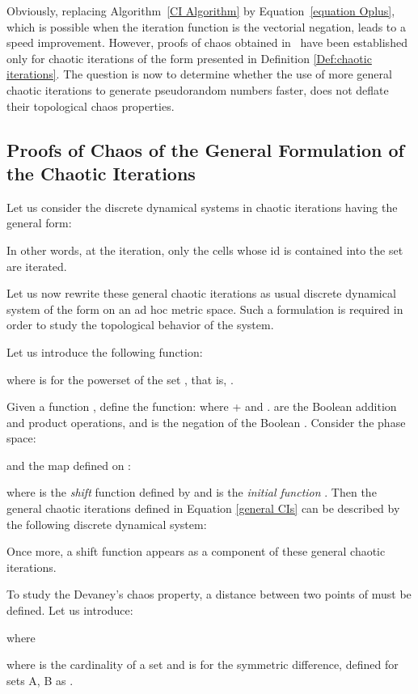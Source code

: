 \documentclass{article}
\begin{document}
Obviously, replacing Algorithm~\ref{CI Algorithm} by 
Equation~\ref{equation Oplus}, which is possible when the iteration function is
the vectorial negation, leads to a speed improvement. However, proofs
of chaos obtained in~\cite{bg10:ij} have been established
only for chaotic iterations of the form presented in Definition 
\ref{Def:chaotic iterations}. The question is now to determine whether the
use of more general chaotic iterations to generate pseudorandom numbers 
faster, does not deflate their topological chaos properties.

\subsection{Proofs of Chaos of the General Formulation of the Chaotic Iterations}
\label{deuxième def}
Let us consider the discrete dynamical systems in chaotic iterations having 
the general form:



In other words, at the  iteration, only the cells whose id is
contained into the set  are iterated.

Let us now rewrite these general chaotic iterations as usual discrete dynamical
system of the form  on an ad hoc metric space. Such a formulation
is required in order to study the topological behavior of the system.

Let us introduce the following function:

where  is for the powerset of the set , that is, .

Given a function , define the function:
where + and . are the Boolean addition and product operations, and  
is the negation of the Boolean .
Consider the phase space:

\noindent and the map defined on :

\noindent where  is the \emph{shift} function defined by  and  is the \emph{initial function} 
. 
Then the general chaotic iterations defined in Equation \ref{general CIs} can 
be described by the following discrete dynamical system:


Once more, a shift function appears as a component of these general chaotic 
iterations. 

To study the Devaney's chaos property, a distance between two points 
 of  must be defined.
Let us introduce:

\noindent where

where  is the cardinality of a set  and  is for the symmetric difference, defined for sets A, B as
.
\end{document}

